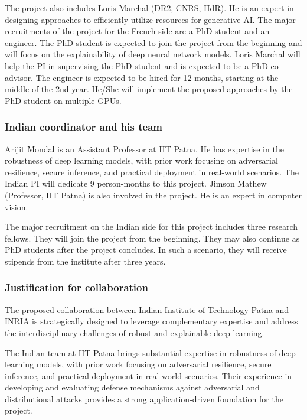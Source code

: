 \documentclass[a4paper,11pt]{article}
\begin{document}
The project also includes Loris Marchal (DR2, CNRS, HdR). He is an expert in designing approaches to efficiently utilize resources for generative AI. The major recruitments of the project for the French side are a PhD student and an engineer. The PhD student is expected to join the project from the beginning and will focus on the explainability of deep neural network models. Loris Marchal will help the PI in supervising the PhD student and is expected to be a PhD co-advisor. The engineer is expected to be hired for 12 months, starting at the middle of the 2nd year. He/She will implement the proposed approaches by the PhD student on multiple GPUs.


\subsubsection{Indian coordinator and his team}
Arijit Mondal is an Assistant Professor at IIT Patna. He has expertise in the robustness of deep learning models, with prior work focusing on adversarial resilience, secure inference, and practical deployment in real-world scenarios. The Indian PI will dedicate 9 person-months to this project. Jimson Mathew (Professor, IIT Patna) is also involved in the project. He is an expert in computer vision.

The major recruitment on the Indian side for this project includes three research fellows. They will join the project from the beginning. They may also continue as PhD students after the project concludes. In such a scenario, they will receive stipends from the institute after three years.


\subsubsection{Justification for collaboration}
The proposed collaboration between Indian Institute of Technology Patna and INRIA is strategically designed to leverage complementary expertise and address the interdisciplinary challenges of robust and explainable deep learning.

The Indian team at IIT Patna brings substantial expertise in robustness of deep learning models, with prior work focusing on adversarial resilience, secure inference, and practical deployment in real-world scenarios. Their experience in developing and evaluating defense mechanisms against adversarial and distributional attacks provides a strong application-driven foundation for the project.
\end{document}
